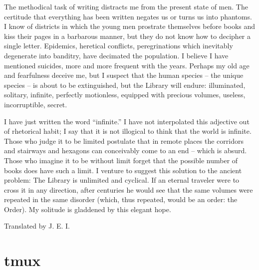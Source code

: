 \documentclass[10pt,twoside,openright]{memoir}
\begin{document}
The methodical task of writing distracts me from the present state of men. The certitude that everything has been written negates us or turns us into phantoms. I know of districts in which the young men prostrate themselves before books and kiss their pages in a barbarous manner, but they do not know how to decipher a single letter. Epidemics, heretical conflicts, peregrinations which inevitably degenerate into banditry, have decimated the population. I believe I have mentioned suicides, more and more frequent with the years. Perhaps my old age and fearfulness deceive me, but I suspect that the human species -- the unique species -- is about to be extinguished, but the Library will endure: illuminated, solitary, infinite, perfectly motionless, equipped with precious volumes, useless, incorruptible, secret.

I have just written the word ``infinite.'' I have not interpolated this adjective out of rhetorical habit; I say that it is not illogical to think that the world is infinite. Those who judge it to be limited postulate that in remote places the corridors and stairways and hexagons can conceivably come to an end -- which is absurd. Those who imagine it to be without limit forget that the possible number of books does have such a limit. I venture to suggest this solution to the ancient problem: The Library is unlimited and cyclical. If an eternal traveler were to cross it in any direction, after centuries he would see that the same volumes were repeated in the same disorder (which, thus repeated, would be an order: the Order). My solitude is gladdened by this elegant hope.

Translated by J. E. I.

\chapter{tmux}
\end{document}
